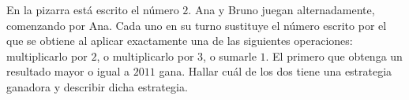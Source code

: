 En la pizarra está escrito el número $2$. Ana y Bruno juegan alternadamente, comenzando por Ana. Cada uno en su turno sustituye el número escrito por el que se obtiene al aplicar exactamente una de las siguientes operaciones: multiplicarlo por $2$, o multiplicarlo por $3$, o sumarle $1$. El primero que obtenga un resultado mayor o igual a $2011$ gana. Hallar cuál de los dos tiene una estrategia ganadora y describir dicha estrategia.
